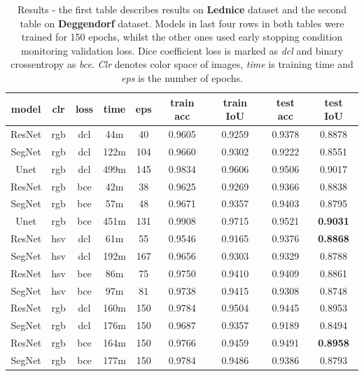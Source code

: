 \begin{table}[h!]
    \begin{tabular}{|c||c|c|c|c|c|c|c|c|} 
		\hline
		model & clr & loss & time & eps & train acc & train IoU & test acc & test IoU \\
		\hline
		ResNet & rgb & dcl & 44m & 40 & 0.9605 & 0.9259 & 0.9378 & 0.8878 \\
		SegNet & rgb & dcl & 122m & 104 & 0.9660 & 0.9302 & 0.9222 & 0.8551 \\
		Unet & rgb & dcl & 499m & 145 & 0.9834 & 0.9606 & 0.9506 & 0.9017 \\
		ResNet & rgb & bce & 42m & 38 & 0.9625 & 0.9269 & 0.9366 & 0.8838 \\
        SegNet & rgb & bce & 57m & 48 & 0.9671 & 0.9357 & 0.9403 & 0.8795 \\
        Unet & rgb & bce & 451m & 131 & 0.9908 & 0.9715 & 0.9521 & \textbf{0.9031} \\
        \hline
        ResNet & hsv & dcl & 61m & 55 & 0.9546 & 0.9165 & 0.9376 & \textbf{0.8868} \\
        SegNet & hsv & dcl & 192m & 167 & 0.9656 & 0.9303 & 0.9329 & 0.8788 \\
        ResNet & hsv & bce & 86m & 75 & 0.9750 & 0.9410 & 0.9409 & 0.8861 \\
        SegNet & hsv & bce & 97m & 81 & 0.9738 & 0.9415 & 0.9308 & 0.8748 \\
        \hline
        ResNet & rgb & dcl & 160m & 150 & 0.9784 & 0.9504 & 0.9445 & 0.8953 \\
        SegNet & rgb & dcl & 176m & 150 & 0.9687 & 0.9357 & 0.9189 & 0.8494 \\
        ResNet & rgb & bce & 164m & 150 & 0.9766 & 0.9459 & 0.9491 & \textbf{0.8958} \\
        SegNet & rgb & bce & 177m & 150 & 0.9784 & 0.9486 & 0.9386 & 0.8793 \\
		\hline
	\end{tabular}

	\caption[Results of various models trained on Lednice and Deggendorf datasets]{Results -
	the first table describes results on \textbf{Lednice} dataset and
	the second table on \textbf{Deggendorf} dataset.
	Models in last four rows in both tables were trained for 150 epochs,
	whilst the other ones used early stopping condition monitoring validation loss.
	Dice coefficient loss is marked as \textit{dcl} and binary crossentropy as \textit{bce}.
	\textit{Clr} denotes color space of images, \textit{time} is training time and  
	\textit{eps} is the number of epochs.}
	\label{tab:results_led_degg}
\end{table}

